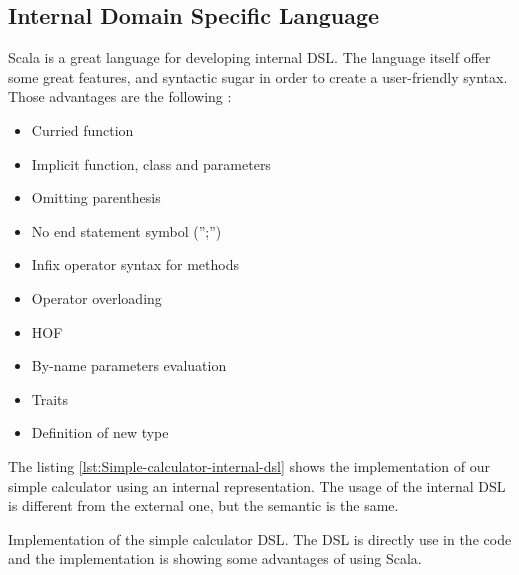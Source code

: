 \subsection{Internal Domain Specific Language}
\label{subsec:scala_internal_dsl}

Scala is a great language for developing internal \gls{DSL}. The language itself
offer some great features, and syntactic sugar in order to create a user-friendly
syntax. Those advantages are the following \cite{filipkrikava2013}:

\begin{itemize}
\item Curried function
\item Implicit function, class and parameters
\item Omitting parenthesis
\item No end statement symbol ('';'')
\item Infix operator syntax for methods
\item Operator overloading
\item \gls{HOF}
\item By-name parameters evaluation
\item Traits
\item Definition of new type
\end{itemize}

The listing \ref{lst:Simple-calculator-internal-dsl} shows the implementation of
our simple calculator using an internal representation. The usage of the
internal \gls{DSL} is different from the external one, but the semantic is the
same.

\begin{listing}[ht]
\centering
{}
\caption[Implementation of the simple calculator \gls{DSL}]{Implementation of
the simple calculator \gls{DSL}. The DSL is directly use in the code and
the implementation is showing some advantages of using Scala.}
\label{lst:Simple-calculator-internal-dsl}
\end{listing}

